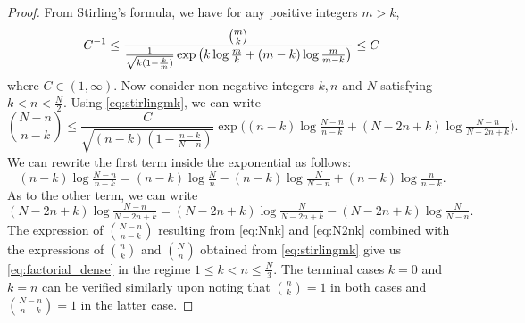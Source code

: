 \documentclass[11pt,reqno,letterpaper]{amsart}
\numberwithin{equation}{section}
\theoremstyle{plain}
\begin{document}
\begin{proof}
From Stirling's formula, we have for any positive integers $m > k$,
\begin{equation}\label{eq:stirlingmk}
C^{-1} \le \frac{\binom{m}{k}}{\frac{1}{%
\sqrt{k(1 - \frac km)}} \exp\big(k \log \tfrac mk + (m - k) \log \tfrac m{m - k}\big)}  \le C
\end{equation}
where $C \in (1, \infty)$. %
Now consider non-negative integers $k, n$ and $N$ satisfying $k < n < \frac N2$. 
Using \eqref{eq:stirlingmk}, we can write
\begin{equation}\label{eq:Nnk}
\binom{N - n}{n-k} \le \frac{C}{\sqrt{(n - k)(1 - \frac{n - k}{N - n})}}  \exp\big((n-k) \log \tfrac {N-n}{n-k} + (N - 2n + k) \log \tfrac{N - n}{N - 2n + k}\big).
\end{equation}
We can rewrite the first term inside the exponential as follows:
\begin{equation}\label{eq:N2nk}
(n-k) \log \tfrac{N-n}{n-k} = (n - k) \log \tfrac N n - (n - k) \log \tfrac N{N-n} + (n - k) \log \tfrac n{n - k}.
\end{equation}
As to the other term, we can write
\begin{equation}\label{eq:decomp}
(N - 2n + k)\log \tfrac {N - n}{N - 2n + k} = (N - 2n + k) \log \tfrac{N}{N - 2n + 
k} - (N - 2n + k)\log \tfrac{N}{N - n}.
\end{equation}
The expression of $\binom{N - n}{n-k}$ resulting from \eqref{eq:Nnk} and 
\eqref{eq:N2nk} combined with the expressions of $\binom{n}{k}$ and $\binom{N}{n}$ 
obtained from \eqref{eq:stirlingmk} give us \eqref{eq:factorial_dense} in the 
regime $1 \le k < n \le \tfrac N3$. The terminal cases $k = 0$ and $k = n$ can be 
verified similarly upon noting that $\binom{n}{k} = 1$ in both cases and $\binom{N 
- n}{n - k} = 1$ in the latter case.


\end{proof}
\end{document}
